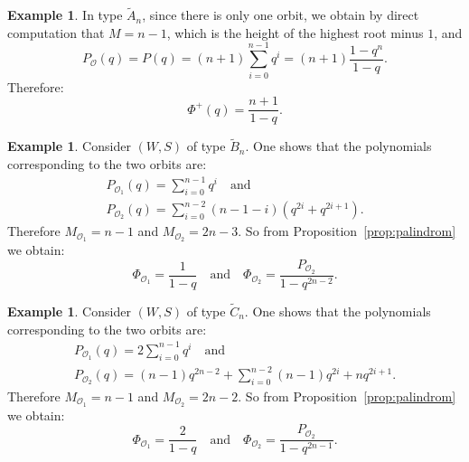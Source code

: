 \documentclass{amsart}
\theoremstyle{definition}
\newtheorem{Example}[Theorem]{Example}
\newcommand{\mo}{\mathcal{O}}
\begin{document}
\begin{Example}
    In type $\widetilde{A}_n$, since there is only one orbit, we obtain by direct computation that $M=n-1$, which is the height of the highest root minus $1$, and  
    $$
    P_{\mo}(q)=P(q)=(n+1)\sum_{i=0}^{n-1}q^i=(n+1)\frac{1-q^{n}}{1-q}.
    $$
    Therefore:
    $$
    \Phi^+(q)=\frac{n+1}{1-q}.
    $$
\end{Example}

\begin{Example}
    Consider $(W,S)$ of type $\widetilde{B}_n$. One shows that the polynomials corresponding to the two orbits are: 
    \begin{eqnarray*}
        &P_{\mo_1}(q)= \sum_{i=0}^{n-1} q^i\quad \mbox{and} &\\
        &  P_{\mo_2}(q)=\sum_{i=0}^{n-2}(n-1-i)\left(q^{2i}+q^{2i+1}\right).&
    \end{eqnarray*}
    Therefore $M_{\mo_1}=n-1$ and $M_{\mo_2}=2n-3$. So from Proposition~\ref{prop:palindrom} we obtain:
    $$
    \Phi_{\mo_1} =\frac{1}{1-q}\quad \mbox{and} \quad \Phi_{\mo_2} =\frac{P_{\mo_2}}{1-q^{2n-2}}.
    $$
\end{Example}

\begin{Example}
    Consider $(W,S)$ of type $\widetilde{C}_n$. One shows that the polynomials corresponding to the two orbits are: 
    \begin{eqnarray*}
        &P_{\mo_1}(q)= 2\sum_{i=0}^{n-1} q^i\quad \mbox{and} &\\
        &  P_{\mo_2}(q)= (n-1)q^{2n-2}+\sum_{i=0}^{n-2}(n-1)q^{2i}+nq^{2i+1}.&
    \end{eqnarray*}
    Therefore $M_{\mo_1}=n-1$ and $M_{\mo_2}=2n-2$. So from Proposition~\ref{prop:palindrom} we obtain:
    $$
    \Phi_{\mo_1} =\frac{2}{1-q}\quad \mbox{and} \quad \Phi_{\mo_2} =\frac{P_{\mo_2}}{1-q^{2n-1}}.
    $$
\end{Example}
\end{document}
